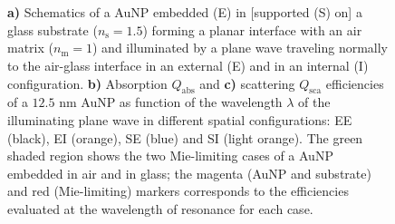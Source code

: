 \begin{figure}[b!]
    \small
    \centering
    \hspace*{-.75\textwidth}%
        \begin{subfigure}{.37\textwidth}\caption{ }\label{sfig:TotallyNormal:1}\end{subfigure}%
        \begin{subfigure}{.25\textwidth}\caption{ }\label{sfig:TotallyNormal:2}\end{subfigure} \\[6em]
    \hspace*{-.38\textwidth}%
        \begin{subfigure}{.25\textwidth}\caption{ }\label{sfig:TotallyNormal:3}\end{subfigure} \\[-9em]
    \def\svgwidth{.95\textwidth}
    \vspace*{0em}
    \caption[Absorption and Scattering Efficiencies of a 12.5 nm AuNP above and below a planar Interface Illuminated at Normal Incidence]{\textbf{a)} Schematics of a AuNP embedded (E) in [supported (S) on] a glass substrate ($n_\text{s} = 1.5$) forming a planar interface with an air matrix ($n_\text{m} = 1$) and illuminated by a plane wave traveling normally to the air-glass interface in an external (E) and in an internal (I) configuration. \textbf{b)} Absorption $Q_\text{abs}$ and \textbf{c)} scattering $Q_\text{sca}$ efficiencies of a $12.5$ nm AuNP as function of the wavelength $\lambda$ of the illuminating plane wave in different spatial configurations: EE (black), EI (orange), SE (blue) and SI (light orange). The green shaded region shows the two Mie-limiting cases of a  AuNP embedded in air and in glass; the magenta (AuNP and substrate) and red (Mie-limiting) markers corresponds to the efficiencies evaluated at the wavelength of resonance for each case.
    }
\label{fig:TotallyNormal}
\end{figure}

